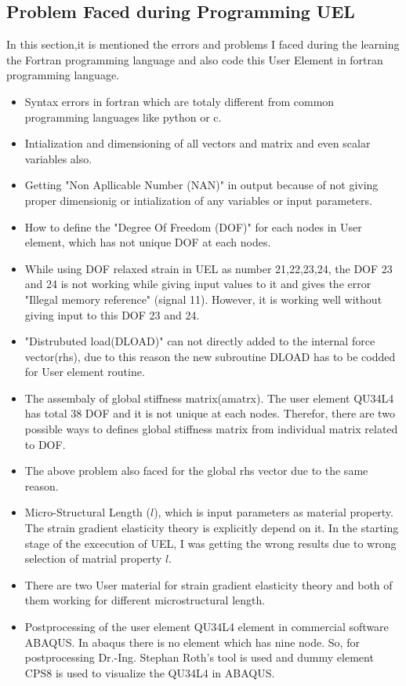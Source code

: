 \documentclass[12pt]{article}
\begin{document}
\subsection{Problem Faced during Programming UEL}
In this section,it is mentioned the errors and problems I faced during the learning the Fortran programming language and also code this User Element in fortran programming language. 
\begin{itemize}
	\item Syntax errors in fortran which are totaly different from common programming languages like python or c.
	\item Intialization and dimensioning of all vectors and matrix and even scalar variables also. 
	\item Getting "Non Apllicable Number (NAN)" in output because of not giving proper dimensionig or intialization of any variables or input parameters.
	\item How to define the "Degree Of Freedom (DOF)" for each nodes in User element, which has not unique DOF at each nodes.
	\item While using DOF relaxed strain in UEL as number 21,22,23,24, the DOF 23 and 24 is not working while giving input values to it and gives the error "Illegal memory reference" (signal 11). However, it is working well without giving input to this DOF 23 and 24.
	\item "Distrubuted load(DLOAD)" can not directly added to the internal force vector(rhs), due to this reason the new subroutine DLOAD has to be codded for User element routine.
	\item The assembaly of global stiffness matrix(amatrx). The user element QU34L4 has total 38 DOF and it is not unique at each nodes. Therefor, there are two possible ways to defines global stiffness matrix from individual matrix related to DOF.
	\item The above problem also faced for the global rhs vector due to the same reason.
	\item Micro-Structural Length ($l$), which is input parameters as material property. The strain gradient elasticity theory is explicitly depend on it. In the starting stage of the excecution of UEL, I was getting the wrong results due to wrong selection of matrial property $l$.  
	\item There are two User material for strain gradient elasticity theory and both of them working for different microstructural length.
	\item Postprocessing of the user element QU34L4 element in commercial software ABAQUS. In abaqus there is no element which has nine node. So, for postprocessing Dr.-Ing. Stephan Roth's tool is used and dummy element CPS8 is used to visualize the QU34L4 in ABAQUS.
\end{itemize}
\end{document}
